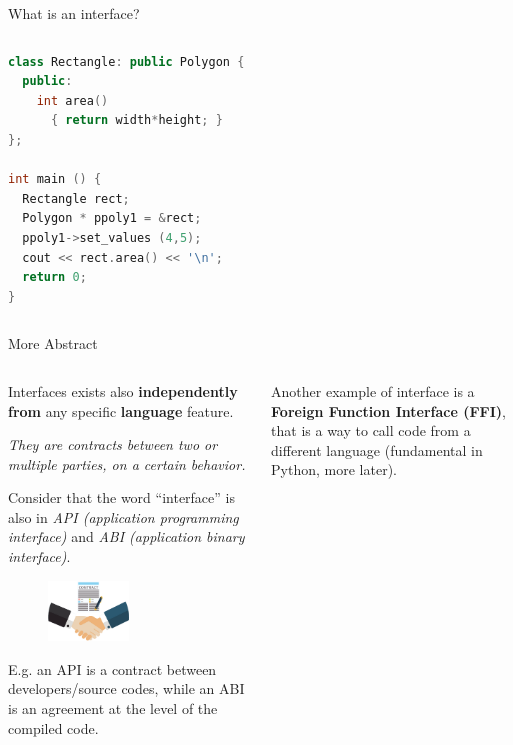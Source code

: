\documentclass[9pt]{beamer}
\begin{document}
\begin{frame}[fragile]{What is an interface?}
\begin{columns}
\begin{column}{0.47\textwidth}
\begin{lstlisting}[language=C++,style=mystyle]
class Rectangle: public Polygon {
  public:
    int area()
      { return width*height; }
};

int main () {
  Rectangle rect;
  Polygon * ppoly1 = &rect;
  ppoly1->set_values (4,5);
  cout << rect.area() << '\n';
  return 0;
}\end{lstlisting}
        \end{column}
        \begin{column}{0.02\textwidth}
        \end{column}
    \end{columns}
\end{frame}

\begin{frame}[fragile]{More Abstract}
    \vspace*{30pt}
    \begin{columns}
        \begin{column}{0.5\textwidth}
            Interfaces exists also \textbf{independently from} any specific
            \textbf{language} feature.

            \begin{center}
                \itshape
                They are \alert{contracts} between two or multiple parties, on
                a certain behavior.
            \end{center}

            Consider that the word \enquote{interface} is also in \textit{API
            (application programming interface)} and \textit{ABI (application
            binary interface)}.\newline

            \begin{figure}
                \centering
                \includegraphics[width=0.5\textwidth]{contract}
            \end{figure}

            E.g. an API is a contract between developers/source codes, while an
            ABI is an agreement at the level of the compiled code.
        \end{column}
        \begin{column}{0.5\textwidth}
            Another example of interface is a \textbf{Foreign Function
            Interface (FFI)}, that is a way to call code from a different
            language (\alert{fundamental in Python}, more later).
            \vspace*{10pt}


\end{column}
\end{columns}
\end{frame}
\end{document}
